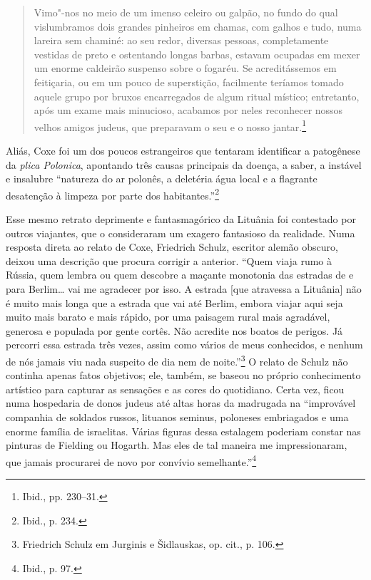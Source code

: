 \begin{quote}
Vimo"-nos no meio de um imenso celeiro ou galpão, no fundo do qual
vislumbramos dois grandes pinheiros em chamas, com galhos e tudo, numa
lareira sem chaminé: ao seu redor, diversas pessoas, completamente
vestidas de preto e ostentando longas barbas, estavam ocupadas em
mexer um enorme caldeirão suspenso sobre o fogaréu. Se acreditássemos em
feitiçaria, ou em um pouco de superstição, facilmente teríamos tomado
aquele grupo por bruxos encarregados de algum ritual místico;
entretanto, após um exame mais minucioso, acabamos por neles reconhecer
nossos velhos amigos judeus, que preparavam o seu e o nosso
jantar.\footnote{Ibid., pp. 230--31.}
\end{quote}

Aliás, Coxe foi um dos poucos estrangeiros que tentaram identificar a
patogênese da \textit{plica Polonica}, apontando três causas principais da
doença, a saber, a instável e insalubre ``natureza do ar polonês, a
deletéria água local e a flagrante desatenção à limpeza por parte dos
habitantes.''\footnote{Ibid., p. 234.}

Esse mesmo retrato deprimente e fantasmagórico da Lituânia foi
contestado por outros viajantes, que o consideraram um exagero
fantasioso da realidade. Numa resposta direta ao relato de Coxe,
Friedrich Schulz, escritor alemão obscuro, deixou uma descrição que
procura corrigir a anterior. ``Quem viaja rumo à Rússia, quem lembra ou
quem descobre a maçante monotonia das estradas de e para Berlim\ldots{}
vai me agradecer por isso. A estrada {[}que atravessa a Lituânia{]} não
é muito mais longa que a estrada que vai até Berlim, embora viajar aqui
seja muito mais barato e mais rápido, por uma paisagem rural mais
agradável, generosa e populada por gente cortês. Não acredite nos boatos
de perigos. Já percorri essa estrada três vezes, assim como vários de
meus conhecidos, e nenhum de nós jamais viu nada suspeito de dia nem de
noite.''\footnote{Friedrich Schulz em Jurginis e Šidlauskas, op. cit., p. 106.} O relato de Schulz não continha apenas fatos objetivos; ele, também, se baseou no próprio conhecimento artístico para capturar as
sensações e as cores do quotidiano. Certa vez, ficou numa hospedaria de
donos judeus até altas horas da madrugada na ``improvável companhia de
soldados russos, lituanos seminus, poloneses embriagados e uma enorme
família de israelitas. Várias figuras dessa estalagem poderiam constar
nas pinturas de Fielding ou Hogarth. Mas eles de tal maneira me
impressionaram, que jamais procurarei de novo por convívio
semelhante.''\footnote{Ibid., p. 97.}

